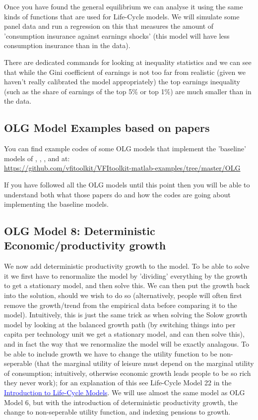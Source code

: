 Once you have found the general equilibrium we can analyse it using the same kinds of functions that are used for Life-Cycle models. We will simulate some panel data and run a regression on this that measures the amount of 'consumption insurance against earnings shocks' (this model will have less consumption insurance than in the data).

There are dedicated commands for looking at inequality statistics and we can see that while the Gini coefficient of earnings is not too far from realistic (given we haven't really calibrated the model appropriately) the top earnings inequality (such as the share of earnings of the top 5\% or top 1\%) are much smaller than in the data.



\subsection{OLG Model Examples based on papers}
You can find example codes of some OLG models that implement the 'baseline' models of \cite*{ImrohorogluImrohorogluJoines1995}, \cite*{Huggett1996}, \cite*{ConesaKrueger1999}, and \cite*{ConesaKitaoKrueger2009} at:
\\ \href{https://github.com/vfitoolkit/VFItoolkit-matlab-examples/tree/master/OLG}{https://github.com/vfitoolkit/VFItoolkit-matlab-examples/tree/master/OLG}

If you have followed all the OLG models until this point then you will be able to understand both what those papers do and how the codes are going about implementing the baseline models.

\subsection{OLG Model 8: Deterministic Economic/productivity growth}
We now add deterministic productivity growth to the model. To be able to solve it we first have to renormalize the model by 'dividing' everything by the growth to get a stationary model, and then solve this. We can then put the growth back into the solution, should we wish to do so (alternatively, people will often first remove the growth/trend from the empirical data before comparing it to the model). Intuitively, this is just the same trick as when solving the Solow growth model by looking at the balanced growth path (by switching things into per capita per technology unit we get a stationary model, and can then solve this), and in fact the way that we renormalize the model will be exactly analagous. To be able to include growth we have to change the utility function to be non-seperable (that the marginal utility of leisure must depend on the marginal utility of consumption; intuitively, otherwise economic growth leads people to be so rich they never work); for an explanation of this see Life-Cycle Model 22 in the \href{https://www.vfitoolkit.com/updates-blog/2021/an-introduction-to-life-cycle-models/}{\textcolor{blue}{Introduction to Life-Cycle Models}}. We will use almost the same model as OLG Model 6, but with the introduction of deterministic productivity growth, the change to non-seperable utility function, and indexing pensions to growth.

